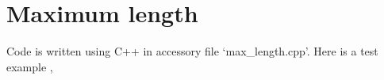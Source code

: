 \section{Maximum length}
Code is written using C++ in accessory file `max\_length.cpp'.
Here is a test example ,
